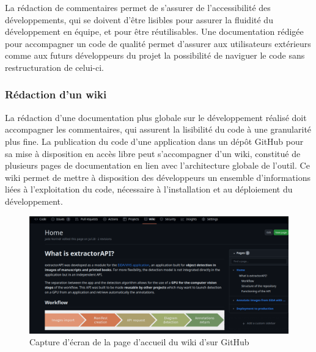 	La rédaction de commentaires permet de s'assurer de l'accessibilité des développements, qui se doivent d'être lisibles pour assurer la fluidité du développement en équipe, et pour être réutilisables. Une documentation rédigée pour accompagner un code de qualité permet d'assurer aux utilisateurs extérieurs comme aux futurs développeurs du projet la possibilité de naviguer le code sans restructuration de celui-ci.

    \subsubsection{Rédaction d'un wiki}
    La rédaction d'une documentation plus globale sur le développement réalisé doit accompagner les commentaires, qui assurent la lisibilité du code à une granularité plus fine. La publication du code d'une application dans un dépôt GitHub pour sa mise à disposition en accès libre peut s'accompagner d'un wiki, constitué de plusieurs pages de documentation en lien avec l'architecture globale de l'outil. Ce wiki permet de mettre à disposition des développeurs un ensemble d'informations liées à l'exploitation du code, nécessaire à l'installation et au déploiement du développement.
    
    \begin{figure}[h]
    	\centering
    	\includegraphics[width=15cm]{images/exapi_wiki.png}
    	\caption{Capture d'écran de la page d'accueil du wiki d'\exapi sur GitHub}
    	\label{fig:exapi_wiki}
    \end{figure}
    
